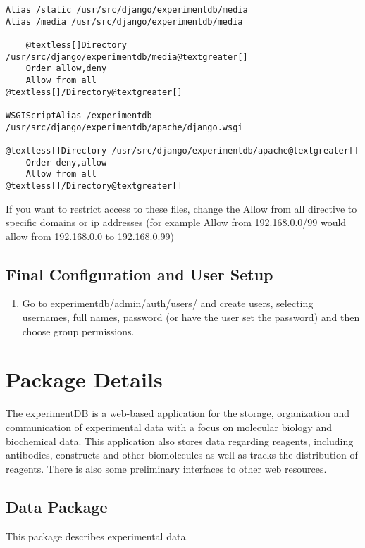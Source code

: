 \documentclass[letterpaper,10pt,english]{sphinxmanual}
\begin{document}
\begin{Verbatim}[commandchars=@\[\]]
Alias /static /usr/src/django/experimentdb/media
Alias /media /usr/src/django/experimentdb/media

    @textless[]Directory /usr/src/django/experimentdb/media@textgreater[]
    Order allow,deny
    Allow from all
@textless[]/Directory@textgreater[]

WSGIScriptAlias /experimentdb /usr/src/django/experimentdb/apache/django.wsgi

@textless[]Directory /usr/src/django/experimentdb/apache@textgreater[]
    Order deny,allow
    Allow from all
@textless[]/Directory@textgreater[]
\end{Verbatim}

If you want to restrict access to these files, change the Allow from all directive to specific domains or ip addresses (for example Allow from 192.168.0.0/99 would allow from 192.168.0.0 to 192.168.0.99)


\section{Final Configuration and User Setup}
\label{installation:final-configuration-and-user-setup}\begin{enumerate}
\item {} 
Go to experimentdb/admin/auth/users/ and create users, selecting usernames, full names, password (or have the user set the password) and then choose group permissions.

\end{enumerate}


\chapter{Package Details}
\label{api:module-experimentdb}\label{api:package-details}\label{api::doc}
The experimentDB is a web-based application for the storage, organization and communication of experimental data with a focus on molecular biology and biochemical data. This application also stores data regarding reagents, including antibodies, constructs and other biomolecules as well as tracks the distribution of reagents. There is also some preliminary interfaces to other web resources.


\section{Data Package}
\label{api:module-experimentdb.data}\label{api:data-package}
This package describes experimental data.
\end{document}
